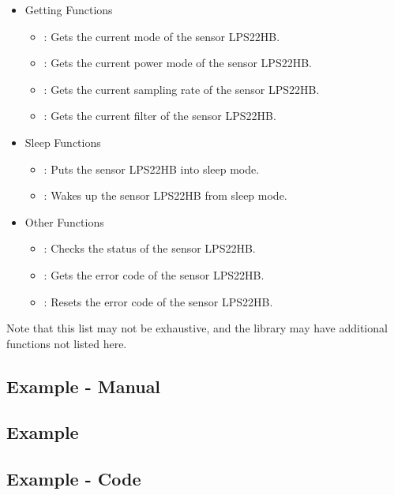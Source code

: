 \begin{itemize}
  \item Getting Functions
    \begin{itemize}
      \item {}: Gets the current mode of the sensor LPS22HB.
      \item {}: Gets the current power mode of the sensor LPS22HB.
      \item {}: Gets the current sampling rate of the sensor LPS22HB.
      \item {}: Gets the current filter of the sensor LPS22HB.
    \end{itemize}
  \item Sleep Functions
    \begin{itemize}
      \item {}: Puts the sensor LPS22HB into sleep mode.
      \item {}: Wakes up the sensor LPS22HB from sleep mode.
    \end{itemize}
  \item Other Functions
    \begin{itemize}
      \item {}: Checks the status of the sensor LPS22HB.
      \item {}: Gets the error code of the sensor LPS22HB.
      \item {}: Resets the error code of the sensor LPS22HB.
    \end{itemize}
\end{itemize}

\medskip

Note that this list may not be exhaustive, and the library may have additional functions not listed here.

\subsection{Example - Manual}

\subsection{Example}

\subsection{Example - Code}

